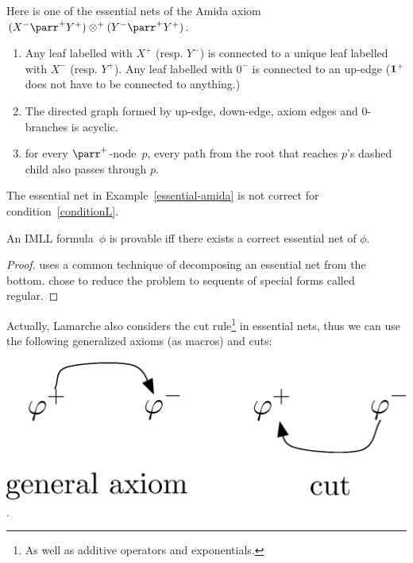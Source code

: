  \begin{example} \label{essential-amida}
  Here is one of the essential nets of
  the Amida axiom $(X^-\parr^+Y^+)\otimes^+(Y^-\parr^+ Y^+)$.
 \end{example}

\begin{enumerate}
 \item Any leaf labelled with $X^+$ (resp. $Y^-$) is connected to a
       unique leaf labelled with $X^-$ (resp. $Y^+$).
       Any leaf labelled with $0^-$ is connected to an up-edge
       ($\mathbf{1}^+$ does not have to be connected to anything.)
 \item The directed graph formed by up-edge, down-edge, axiom edges and
       0-branches is acyclic.
 \item \label{conditionL}
       for every $\parr^+$-node~$p$, every path from the root that reaches
       $p$'s dashed child also passes through $p$.
\end{enumerate}
The essential net in Example~\ref{essential-amida} is not correct for
condition~\ref{conditionL}.

 \begin{theorem}
  An IMLL formula~$\phi$ is provable iff there exists a correct essential net
  of $\phi$.
 \end{theorem}
 \begin{proof}
  \citet{lamarche2008} uses a common technique of decomposing an
  essential net from the bottom.
  \citet{murawski2003} chose to reduce the problem to sequents of special forms
  called regular.
 \end{proof}

 Actually, Lamarche also considers the cut rule\footnote{As well as
 additive operators and exponentials.} in essential nets, thus
 we can use the following generalized axioms (as macros) and cuts:
 \begin{center}
  \includegraphics[scale=0.4]{general-axiom-cut.eps}\enspace.
 \end{center}

